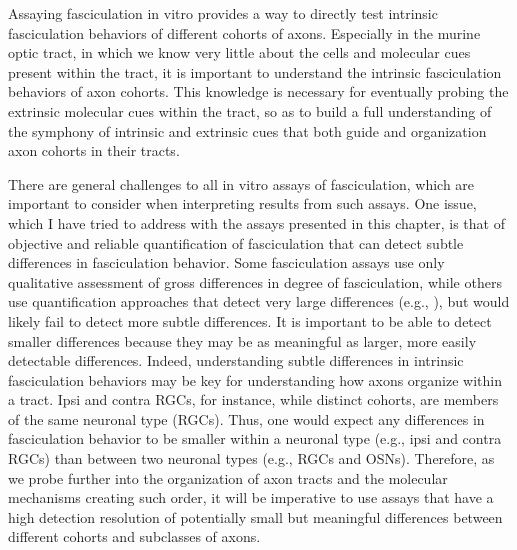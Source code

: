 Assaying fasciculation in vitro provides a way to directly test intrinsic fasciculation behaviors of different cohorts of axons.
Especially in the murine optic tract, in which we know very little about the cells and molecular cues present within the tract, it is important to understand the intrinsic fasciculation behaviors of axon cohorts.
This knowledge is necessary for eventually probing the extrinsic molecular cues within the tract, so as to build a full understanding of the symphony of intrinsic and extrinsic cues that both guide and organization axon cohorts in their tracts.

There are general challenges to all in vitro assays of fasciculation, which are important to consider when interpreting results from such assays.
One issue, which I have tried to address with the assays presented in this chapter, is that of objective and reliable quantification of fasciculation that can detect subtle differences in fasciculation behavior.
Some fasciculation assays use only qualitative assessment of gross differences in degree of fasciculation, while others use quantification approaches that detect very large differences (e.g., ), but would likely fail to detect more subtle differences.
It is important to be able to detect smaller differences because they may be as meaningful as larger, more easily detectable differences.
Indeed, understanding subtle differences in intrinsic fasciculation behaviors may be key for understanding how axons organize within a tract.
Ipsi and contra RGCs, for instance, while distinct cohorts, are members of the same neuronal type (RGCs). 
Thus, one would expect any differences in fasciculation behavior to be smaller within a neuronal type (e.g., ipsi and contra RGCs) than between two neuronal types (e.g., RGCs and OSNs).
Therefore, as we probe further into the organization of axon tracts and the molecular mechanisms creating such order, it will be imperative to use assays that have a high detection resolution of potentially small but meaningful differences between different cohorts and subclasses of axons.

